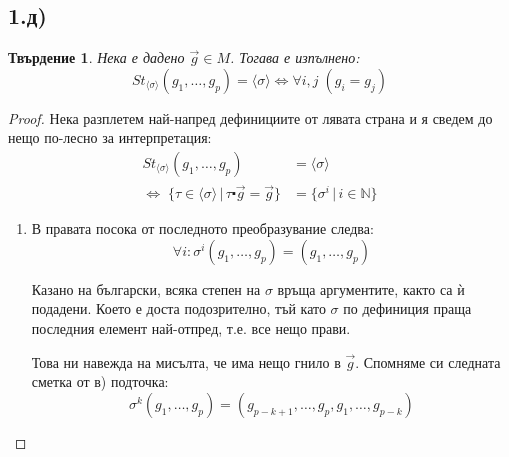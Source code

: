 \documentclass{article}
\newtheorem*{prop}{Твърдение}
\theoremstyle{definition}
\newcommand{\grsigma}[0]{{\langle \sigma \rangle}}
\begin{document}
\subsection*{1.д)}

\begin{prop}
    Нека е дадено $\vec g \in M$. Тогава е изпълнено:
    $$St_{\grsigma}(g_1,\dots, g_p) = \grsigma \Longleftrightarrow \forall i, j \; (g_i = g_j) $$
\end{prop}
\begin{proof}
    Нека разплетем най-напред дефинициите от лявата страна и я сведем до нещо по-лесно за интерпретация:
    \begin{align*}
        St_{\grsigma}(g_1,\dots, g_p) &= \grsigma \\
        \Leftrightarrow\; \{ \tau \in \grsigma \,|\, \tau \centerdot \vec g = \vec g \} &= \{ \sigma^i \,|\, i \in \mathbb N \}
    \end{align*}

    \begin{enumerate}
        \item В правата посока от последното преобразувание следва: $$\forall i:\!\sigma^i(g_1,\dots, g_p) = (g_1,\dots, g_p)$$

            Казано на български, всяка степен на $\sigma$ връща аргументите, както са ѝ подадени.
            Което е доста подозрително, тъй като $\sigma$ по дефиниция праща последния елемент най-отпред, т.е. все нещо прави.

            Това ни навежда на мисълта, че има нещо гнило в $\vec g$.
            Спомняме си следната сметка от в) подточка:
            $$\sigma^k(g_1, \dots, g_p) = (g_{p-k+1}, \dots, g_p, g_1,\dots, g_{p-k})$$


\end{enumerate}
\end{proof}
\end{document}

